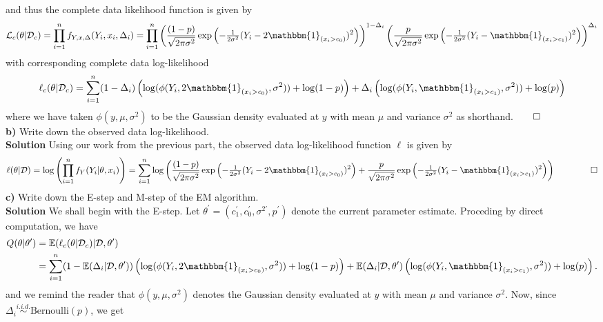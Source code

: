 \documentclass[10pt]{article}
\newcommand{\E}{\mathbb{E}}
\newcommand{\bp}[1]{\left({#1}\right)}
\newcommand{\1}[1]{\mathbbm{1}_{#1}}
\newcommand{\mc}[1]{\mathcal{#1}}
\begin{document}
and thus the complete data likelihood function is given by
\begin{align*}
    \mc{L}_c(\theta|\mc{D}_c)=\prod_{i=1}^nf_{Y,x,\Delta}(Y_i,x_i,\Delta_i)=\prod_{i=1}^n\bp{\frac{(1-p)}{\sqrt{2\pi\sigma^2}}\exp\bp{-\tfrac{1}{2\sigma^2}(Y_i-2\mathbbm{1}_{(x_i>c_0)})^2}}^{1-\Delta_i}\bp{\frac{p}{\sqrt{2\pi\sigma^2}}\exp\bp{-\tfrac{1}{2\sigma^2}(Y_i-\mathbbm{1}_{(x_i>c_1)})^2}}^{\Delta_i}
\end{align*}
with corresponding complete data log-likelihood
\begin{align*}
    \ell_c(\theta|\mc{D}_c)=\sum_{i=1}^n(1-\Delta_i)\bp{\log(\phi(Y_i,2\mathbbm{1}_{(x_i>c_0)},\sigma^2))+\log(1-p)}+\Delta_i\bp{\log(\phi(Y_i,\mathbbm{1}_{(x_i>c_1)},\sigma^2))+\log(p)}
\end{align*}
where we have taken $\phi(y,\mu,\sigma^2)$ to be the Gaussian density evaluated at $y$ with mean $\mu$ and variance $\sigma^2$ as shorthand.\hfill{$\qed$}\\[5pt]
{\bf b)} Write down the observed data log-likelihood.\\[5pt]
{\bf Solution}\hspace{5pt} Using our work from the previous part, the observed data log-likelihood function $\ell$ is given by
\begin{align*}
    \ell(\theta|\mc{D})=\log\left(\prod_{i=1}^nf_Y(Y_i|\theta,x_i)\right)=\sum_{i=1}^n\log\left(\frac{(1-p)}{\sqrt{2\pi\sigma^2}}\exp\bp{-\tfrac{1}{2\sigma^2}(Y_i-2\mathbbm{1}_{(x_i>c_0)})^2}+\frac{p}{\sqrt{2\pi\sigma^2}}\exp\bp{-\tfrac{1}{2\sigma^2}(Y_i-\mathbbm{1}_{(x_i>c_1)})^2}\right)\tag*{$\qed$}
\end{align*}
{\bf c)} Write down the E-step and M-step of the EM algorithm.\\[5pt]
{\bf Solution}\hspace{5pt} We shall begin with the E-step. Let $\theta^\prime=(c_1^\prime,c_0^\prime,\sigma^{2\prime},p^\prime)$ denote the current parameter estimate.  Proceding by direct computation, we have
\begin{align*}
    Q(\theta|\theta^\prime)&=\E(\ell_c(\theta|\mc{D}_c)|\mc{D},\theta^\prime)\\
    &=\sum_{i=1}^n(1-\E(\Delta_i|\mc{D},\theta^\prime))\bp{\log(\phi(Y_i,2\mathbbm{1}_{(x_i>c_0)},\sigma^2))+\log(1-p)}+\E(\Delta_i|\mc{D},\theta^\prime)\bp{\log(\phi(Y_i,\mathbbm{1}_{(x_i>c_1)},\sigma^2))+\log(p)}.
\end{align*}
and we remind the reader that $\phi(y,\mu,\sigma^2)$ denotes the Gaussian density evaluated at $y$ with mean $\mu$ and variance $\sigma^2$. Now, since $\Delta_i\overset{i.i.d.}{\sim}\text{Bernoulli}(p)$, we get
\end{document}
